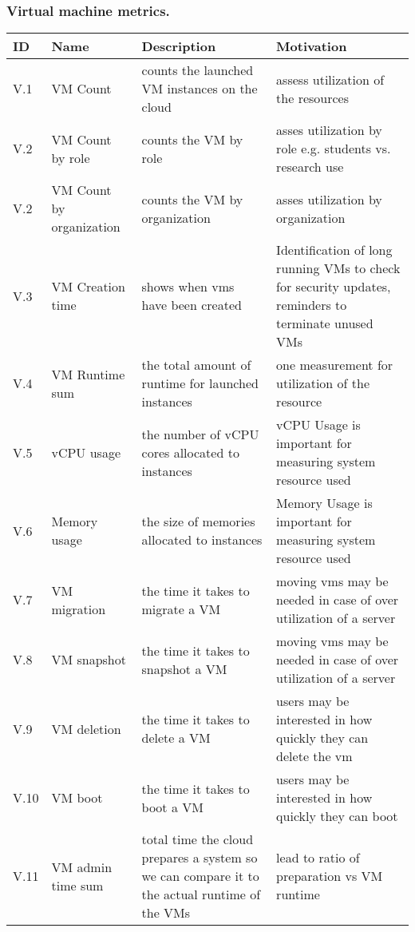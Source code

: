 \documentclass{beamer}
\newcommand{\eTABLE}{\end{tabular}
\end{center}
\end{scriptsize}
}
\newcommand{\bTABLE}[2]{
\frametitle{#1}
\bigskip
\begin{scriptsize}
\begin{center}
\begin{tabular}{lp{0.15\textwidth}p{0.3\textwidth}p{0.4\textwidth}}
\hline
\rowcolor{blue!20} \bf ID & \bf Name & \bf Description & \bf Motivation \\
\hline}
\newenvironment{METRICTABLE}[2] {\bTABLE{#1}{#2}}{\eTABLE}
\begin{document}
\begin{frame}[shrink]
\begin{METRICTABLE}{Virtual machine metrics.}{T:vm}
V.1 & VM Count              &  counts the launched VM instances on the cloud & assess utilization of the resources \\ \hline
V.2 & VM Count by role & counts the VM by role & asses utilization by role e.g. students vs. research use \\ \hline
V.2 & VM Count by organization & counts the VM by organization & asses utilization by organization \\ \hline
V.3 & VM Creation time & shows when vms have been created & Identification of long running VMs to check for security updates, reminders to terminate unused VMs \\ \hline
V.4 & VM Runtime sum   & the total amount of runtime for launched instances & one measurement for utilization of the resource \\ \hline
V.5 & vCPU usage          & the number of vCPU cores allocated to instances & vCPU Usage is important for measuring system resource used \\ \hline
V.6 & Memory usage      & the size of memories allocated to instances & Memory Usage is important for measuring system resource used \\ \hline
V.7 & VM migration      &  the time it takes to migrate a VM & moving vms may be needed in case of over utilization of a server \\ \hline
V.8 & VM snapshot      &  the time it takes to snapshot a VM & moving vms may be needed in case of over utilization of a server \\ \hline
V.9 & VM deletion      &  the time it takes to delete a VM & users may be interested in how quickly they can delete the vm \\ \hline
V.10 & VM boot      &  the time it takes to boot a VM & users may be interested in how quickly they can boot \\ \hline
V.11 & VM admin time sum      & total time the cloud prepares a system so we can compare it to the actual runtime of the VMs & lead to ratio of preparation vs VM runtime \\ \hline
\end{METRICTABLE}
\end{frame}
\end{document}
